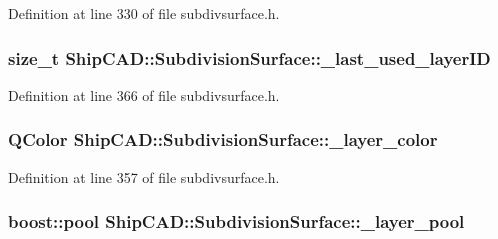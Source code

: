 Definition at line 330 of file subdivsurface.\-h.

\hypertarget{classShipCAD_1_1SubdivisionSurface_a0ba5c4e08110400890eb60140f3e2058}{
\subsubsection[{\-\_\-last\-\_\-used\-\_\-layer\-I\-D}]{\setlength{\rightskip}{0pt plus 5cm}size\-\_\-t Ship\-C\-A\-D\-::\-Subdivision\-Surface\-::\-\_\-last\-\_\-used\-\_\-layer\-I\-D\hspace{0.3cm}{\ttfamily [protected]}}}\label{classShipCAD_1_1SubdivisionSurface_a0ba5c4e08110400890eb60140f3e2058}


Definition at line 366 of file subdivsurface.\-h.

\hypertarget{classShipCAD_1_1SubdivisionSurface_a0833012e177dfd6cdb71174cb7baed17}{
\subsubsection[{\-\_\-layer\-\_\-color}]{\setlength{\rightskip}{0pt plus 5cm}Q\-Color Ship\-C\-A\-D\-::\-Subdivision\-Surface\-::\-\_\-layer\-\_\-color\hspace{0.3cm}{\ttfamily [protected]}}}\label{classShipCAD_1_1SubdivisionSurface_a0833012e177dfd6cdb71174cb7baed17}


Definition at line 357 of file subdivsurface.\-h.

\hypertarget{classShipCAD_1_1SubdivisionSurface_a953485df23e6f7393868b436384debef}{
\subsubsection[{\-\_\-layer\-\_\-pool}]{\setlength{\rightskip}{0pt plus 5cm}boost\-::pool Ship\-C\-A\-D\-::\-Subdivision\-Surface\-::\-\_\-layer\-\_\-pool\hspace{0.3cm}{\ttfamily [protected]}}}\label{classShipCAD_1_1SubdivisionSurface_a953485df23e6f7393868b436384debef}


